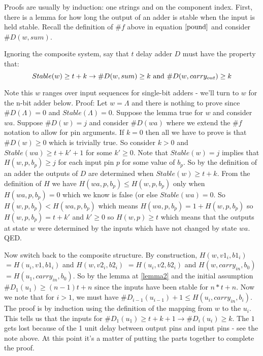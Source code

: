 \documentclass[runningheads,letter]{llncs}
\newcommand{\ess}{\Lambda}
\begin{document}
Proofs are usually by induction: one strings and on the component index.
First, there is a lemma
for how long the output of an adder is stable when the input is held stable.
Recall the definition of $\#f$ above in equation $\ref{pound}$ and 
consider $\#D(w,sum)$. 

Ignoring the composite system, say that $t$ delay adder $D$ must have the 
property that:
\begin{equation}
Stable(w)\geq t+k \nonumber\\
\rightarrow \#D(w,sum) \geq k\mbox{ and }\#D(w,carry_{out})\geq k\label{lemma2}
\end{equation}

Note this $w$ ranges over input sequences for single-bit adders - we'll turn to
$w$ for the n-bit adder below.
Proof: Let $w=\ess$ and there is nothing to prove since $\#D(\ess)=0$
and $Stable(\ess)=0$. Suppose the lemma true for $w$ and consider $wa$.
Suppose $\#D(w)=j$ and
consider $\#D(wa)$ where we extend the $\#f$ notation to allow for pin arguments.
If $k=0$ then
all we have to prove is that $\#D(w)\geq 0$ which is trivially true. So 
consider $k>0$ and $Stable(wa)\geq t+ k'+1$ for some $k'\geq 0$.
Note that $Stable(w)=j$ implies that $H(w,p,b_p)\geq j$ for
each input  pin $p$ for some value of $b_p$.
So by the definition of
an adder the outputs of $D$ are determined when $Stable(w)\geq t+k$.
From the definition of $H$ we have $H(wa,p,b_p)\leq H(w,p,b_p)$ only when $H(wa,p,b_p)=0$
which we know is false (or else $Stable(wa)=0$.
So $H(w,p,b_p)< H(wa,p,b_p)$ which means $H(wa,p,b_p)= 1+H(w,p,b_p)$
so $H(w,p,b_p)=t+k'$ and $k'\geq 0$ so $H(w,p)\geq t$ which means that the
outputs at state $w$ were determined by the inputs which have not changed
by state $wa$. QED.

Now switch back to the composite structure.
By construction, $H(w,v1_i,b1_i)$ $ = H(u_i,v1,b1_i)$ and $H(w,v2_i,b2_i)$ $=H(u_i,v2,b2_i)$ and 
$H(w,carry_{in},b_0)$ $ = H(u_1,carry_{in},b_0)$. So by the lemma at \ref{lemma2} and the initial assumption
$\#D_1(u_1) \geq (n-1)t+n$ since the inputs have been stable for
$n*t+n$. Now we note that for $i>1$, we must have
$\#D_{i-1}(u_{i-1}) +1 \leq H(u_i,carry_{in},b_i)$. The proof is by induction
using the definition of the mapping from $w$ to the $u_i$.  This tells us that the inputs for $\#D_1(u_1) \geq t+k+1 \rightarrow \#D_i(u_i) \geq k$. The $1$ gets lost because of the 1 unit delay between output pins and input pins - see the
note above. At this point it's a matter of putting the parts together to complete the proof.
\end{document}
